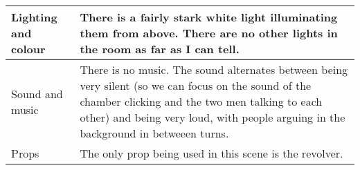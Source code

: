 \documentclass[notitlepage]{fhnwreport}
\begin{document}
\begin{center}
\begin{threeparttable}
\begin{tabular}{p{4.2cm}p{11cm}}
        \midrule
        Lighting and colour &

There is a fairly stark white light illuminating them from above. There are no
other lights in the room as far as I can tell. \\

        \midrule
        Sound and music &

There is no music. The sound alternates between being very  silent  (so we can
focus on the sound of  the  chamber  clicking  and the two men talking to each
other) and being very loud, with  people arguing in the background in betweeen
turns.\\

        \midrule
        Props &

The only prop being used in this scene is the revolver. \\

        \midrule
    \end{tabular}
\end{threeparttable}
\end{center}
\end{document}

